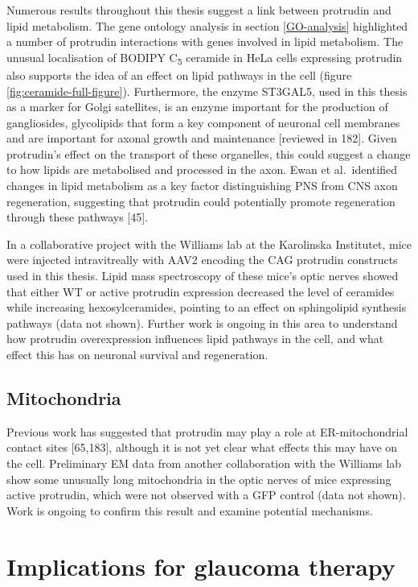 \documentclass[
  12pt,
  a4paper,
]{book}
\begin{document}
Numerous results throughout this thesis suggest a link between protrudin and lipid metabolism. The gene ontology analysis in section \ref{GO-analysis} highlighted a number of protrudin interactions with genes involved in lipid metabolism. The unusual localisation of BODIPY C\textsubscript{5} ceramide in HeLa cells expressing protrudin also supports the idea of an effect on lipid pathways in the cell (figure \ref{fig:ceramide-full-figure}). Furthermore, the enzyme ST3GAL5, used in this thesis as a marker for Golgi satellites, is an enzyme important for the production of gangliosides, glycolipids that form a key component of neuronal cell membranes and are important for axonal growth and maintenance {[}reviewed in 182{]}. Given protrudin's effect on the transport of these organelles, this could suggest a change to how lipids are metabolised and processed in the axon. Ewan et al.~identified changes in lipid metabolism as a key factor distinguishing PNS from CNS axon regeneration, suggesting that protrudin could potentially promote regeneration through these pathways {[}45{]}.

In a collaborative project with the Williams lab at the Karolinska Institutet, mice were injected intravitreally with AAV2 encoding the CAG protrudin constructs used in this thesis. Lipid mass spectroscopy of these mice's optic nerves showed that either WT or active protrudin expression decreased the level of ceramides while increasing hexosylceramides, pointing to an effect on sphingolipid synthesis pathways (data not shown). Further work is ongoing in this area to understand how protrudin overexpression influences lipid pathways in the cell, and what effect this has on neuronal survival and regeneration.

\subsection{Mitochondria}\label{mitochondria-1}

Previous work has suggested that protrudin may play a role at ER-mitochondrial contact sites {[}65,183{]}, although it is not yet clear what effects this may have on the cell. Preliminary EM data from another collaboration with the Williams lab show some unusually long mitochondria in the optic nerves of mice expressing active protrudin, which were not observed with a GFP control (data not shown). Work is ongoing to confirm this result and examine potential mechanisms.

\section{Implications for glaucoma therapy}\label{implications-for-glaucoma-therapy}
\end{document}
